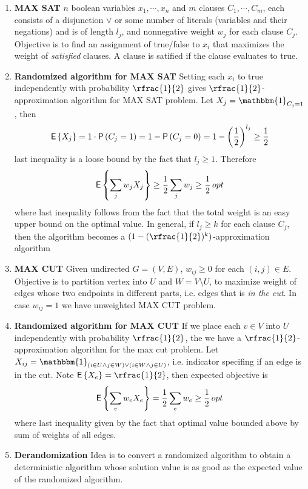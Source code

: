 \documentclass[11pt]{article}
\begin{document}
\begin{enumerate}
    \item \textbf{MAX SAT} $n$ boolean variables $x_1,\cdots, x_n$ and $m$ clauses $C_1,\cdots,C_m$, each consists of a disjunction $\lor$ or some number of literals (variables and their negations) and is of length $l_j$, and nonnegative weight $w_j$ for each clause $C_j$. Objective is to find an assignment of true/false to $x_i$ that maximizes the weight of \textit{satisfied} clauses. A clause is satified if the clause evaluates to true. 
    \item \textbf{Randomized algorithm for MAX SAT} Setting each $x_i$ to true independently with probability $\rfrac{1}{2}$ gives $\rfrac{1}{2}$-approximation algorithm for MAX SAT problem. Let $X_j = \mathbbm{1}_{C_j=1}$, then 
    \[
        \mathsf{E}\left\{X_j\right\} 
        = 1\cdot \mathsf{P}\left(C_j=1\right)
        = 1 - \mathsf{P}\left(C_j=0\right)
        = 1 - \left(\frac{1}{2} \right)^{l_j}
        \geq \frac{1}{2}
    \]
    last inequality is a loose bound by the fact that $l_j \geq 1$. Therefore 
    \[
        \mathsf{E}\left\{\sum_j w_j X_j\right\} \geq \frac{1}{2} \sum_j w_j \geq \frac{1}{2}\, opt    
    \]
    where last inequality follows from the fact that the total weight is an easy upper bound on the optimal value. In general, if $l_j \geq k$ for each clause $C_j$, then the algorithm becomes a $(1 - (\rfrac{1}{2})^k)$-approximation algorithm
    \item \textbf{MAX CUT} Given undirected $G=(V,E)$, $w_{ij} \geq 0$ for each $(i,j)\in E$. Objective is to partition vertex into $U$ and $W = V \setminus U$, to maximize weight of edges whose two endpoints in different parts, i.e. edges that is \textit{in the cut}. In case $w_{ij}=1$ we have unweighted MAX CUT problem.
    \item \textbf{Randomized algorithm for MAX CUT} If we place each $v\in V$ into $U$ independently with probability $\rfrac{1}{2}$, the we have a $\rfrac{1}{2}$-approximation algorithm for the max cut problem. Let $X_{ij} = \mathbbm{1}_{(i\in U \land j\in W)\lor(i\in W \land j\in U) }$, i.e. indicator specifing if an edge is in the cut. Note $\E{X_e} = \rfrac{1}{2}$, then expected objective is 
    \[
        \mathsf{E}\left\{\sum_e w_e X_e\right\} = \frac{1}{2} \sum_e w_e \geq \frac{1}{2} \, opt
    \]
    where last inequality given by the fact that optimal value bounded above by sum of weights of all edges.
    \item \textbf{Derandomization} Idea is to convert a randomized algorithm to obtain a deterministic algorithm whose solution value is as good as the expected value of the randomized algorithm. 

\end{enumerate}
\end{document}
